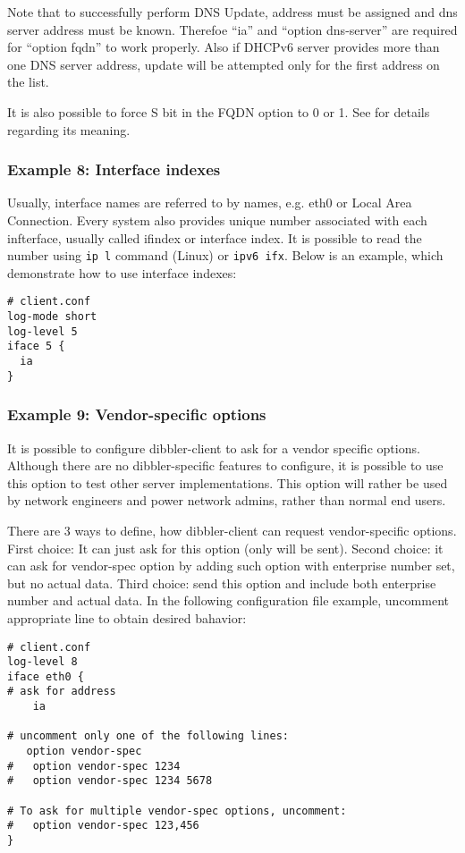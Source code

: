 Note that to successfully perform DNS Update, address must be assigned
and dns server address must be known. Therefoe  ``ia'' and ``option
dns-server'' are required for ``option fqdn'' to work properly. Also if
DHCPv6 server provides more than one DNS server address, update will
be attempted only for the first address on the list.

It is also possible to force S bit in the FQDN option to 0 or 1. See
\cite{rfc4704} for details regarding its meaning.

\subsubsection{Example 8: Interface indexes}
Usually, interface names are referred to by names, e.g. eth0 or Local
Area Connection. Every system also provides unique number associated
with each infterface, usually called ifindex or interface index. It is
possible to read the number using \verb+ip l+ command (Linux) or
\verb+ipv6 ifx+. Below is an example, which demonstrate how to use
interface indexes:

\begin{lstlisting}
# client.conf
log-mode short
log-level 5
iface 5 {
  ia
}
\end{lstlisting}

\subsubsection{Example 9: Vendor-specific options}
\label{example-client-vendor-spec}
It is possible to configure dibbler-client to ask for a vendor specific
options. Although there are no dibbler-specific features to configure,
it is possible to use this option to test other server
implementations. This option will rather be used by network engineers
and power network admins, rather than normal end users.

There are 3 ways to define, how dibbler-client can request
vendor-specific options. First choice: It can just ask for this option (only
 will be sent). Second choice: it can ask for
vendor-spec option by adding such option with enterprise number set, but
no actual data. Third choice: send this option and include both
enterprise number and actual data. In the following configuration file
example, uncomment appropriate line to obtain desired bahavior:

\begin{lstlisting}
# client.conf
log-level 8
iface eth0 {
# ask for address
    ia

# uncomment only one of the following lines:
   option vendor-spec
#   option vendor-spec 1234
#   option vendor-spec 1234 5678

# To ask for multiple vendor-spec options, uncomment:
#   option vendor-spec 123,456
}
\end{lstlisting}


